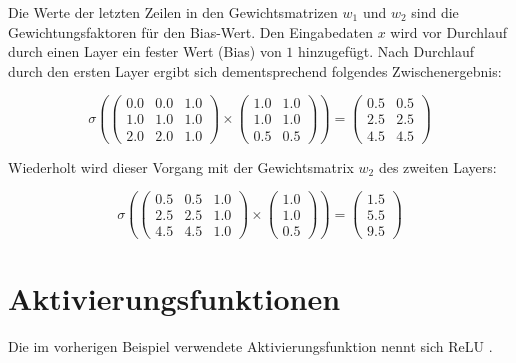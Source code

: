 Die Werte der letzten Zeilen in den Gewichtsmatrizen $ w_{1} $ und $ w_{2} $ sind die Gewichtungsfaktoren für den Bias-Wert. Den Eingabedaten $ x $ wird vor Durchlauf durch einen Layer ein fester Wert (Bias) von $ 1 $ hinzugefügt. Nach Durchlauf durch den ersten Layer ergibt sich dementsprechend folgendes Zwischenergebnis:

\begin{equation}
	\sigma \left(
	\begin{pmatrix} 
		0.0 & 0.0 & 1.0 \\
		1.0 & 1.0 & 1.0 \\ 
		2.0 & 2.0 & 1.0
	\end{pmatrix} 
	\times
	\begin{pmatrix} 
		1.0 & 1.0 \\
		1.0 & 1.0 \\ 
		0.5 & 0.5
	\end{pmatrix}
	\right)
	= 
	\begin{pmatrix} 
		0.5 & 0.5 \\
		2.5 & 2.5 \\ 
		4.5 & 4.5
	\end{pmatrix}
\end{equation}

Wiederholt wird dieser Vorgang mit der Gewichtsmatrix $ w_{2} $ des zweiten Layers:

\begin{equation}
	\sigma \left(
	\begin{pmatrix} 
		0.5 & 0.5 & 1.0 \\
		2.5 & 2.5 & 1.0 \\ 
		4.5 & 4.5 & 1.0
	\end{pmatrix}
	\times
	\begin{pmatrix} 
		1.0 \\
		1.0 \\ 
		0.5
	\end{pmatrix}
	\right)
	= 
	\begin{pmatrix} 
		1.5 \\
		5.5 \\ 
		9.5
	\end{pmatrix}
\end{equation}

\section{Aktivierungsfunktionen}
\label{sec:activation_functions}

Die im vorherigen Beispiel verwendete Aktivierungsfunktion nennt sich ReLU \cite{Nair:2010:RLU:3104322.3104425}.

